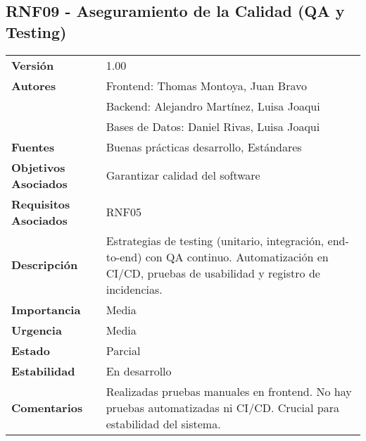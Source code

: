 \documentclass{article}
\begin{document}
\subsection*{RNF09 - Aseguramiento de la Calidad (QA y Testing)}
\begin{longtable}{>{\bfseries}l p{}}
Versión & 1.00 \\
Autores & Frontend: Thomas Montoya, Juan Bravo \\
        & Backend: Alejandro Martínez, Luisa Joaqui \\
        & Bases de Datos: Daniel Rivas, Luisa Joaqui \\
Fuentes & Buenas prácticas desarrollo, Estándares \\
Objetivos Asociados & Garantizar calidad del software \\
Requisitos Asociados & RNF05 \\
Descripción & Estrategias de testing (unitario, integración, end-to-end) con QA continuo. Automatización en CI/CD, pruebas de usabilidad y registro de incidencias. \\
Importancia & Media \\
Urgencia & Media \\
Estado & Parcial \\
Estabilidad & En desarrollo \\
Comentarios & Realizadas pruebas manuales en frontend. No hay pruebas automatizadas ni CI/CD. Crucial para estabilidad del sistema. \\
\end{longtable}
\end{document}
